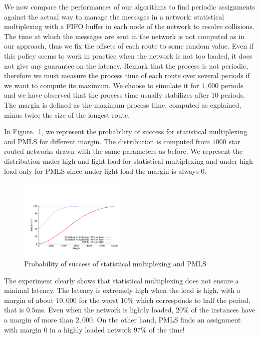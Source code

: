 \documentclass[a4paper,10pt]{IEEEtran}
\begin{document}
    We now compare the performances of our algorithms to find periodic assignments against the actual way to manage the messages in a network:  statistical multiplexing with a FIFO buffer in each node of the network to resolve collisions. The time at which the messages are sent in the network is not computed as in our approach, thus we fix the offsets of each route to some random value.
     Even if this policy seems to work in practice when the network is not too loaded, it does not give any guarantee on the latency. Remark that the process is not periodic, therefore we must measure the process time of each route over several periods if we want to compute its maximum. We choose to simulate it for $1,000$ periods and we have observed that the process time usually stabilizes after $10$ periods. The margin is defined as the maximum process time, computed as explained, minus twice the size of the longest route. 
	    
     In Figure.~\ref{fig:sto}, we represent the probability of success for statistical multiplexing and PMLS for different margin. The distribution is computed from $1000$ star routed networks drawn with the same parameters as before. We represent the distribution under high and light load for statistical multiplexing and under high load only for PMLS since under light load the margin is always $0$. 
     

    \begin{figure}
       \begin{center}
      \includegraphics[width = 0.45\textwidth]{stochastic.pdf}
      \end{center}
      \caption{Probability of success of statistical multiplexing and PMLS}
      \label{fig:sto}   
     \end{figure}    
 
     The experiment clearly shows that statistical multiplexing does not ensure a minimal latency. 
     The latency is extremely high when the load is high, with a margin of about $10,000$ for the worst $10\%$ which corresponds to half the period, that is $0.5$ms. Even when the network is lightly loaded, $20\%$ of the instances have a margin of more than $2,000$. On the other hand, PMLS finds an assignment with margin $0$ in a highly loaded network $97\%$ of the time! 
\end{document}
